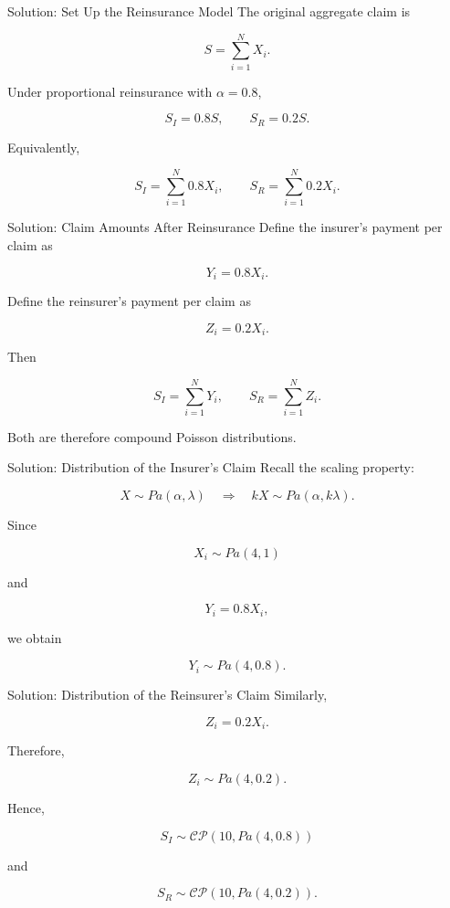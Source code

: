\documentclass[
  ignorenonframetext,
  aspectratio=169,
]{beamer}
\begin{document}
\begin{frame}{Solution: Set Up the Reinsurance Model}
\protect{}\label{solution-set-up-the-reinsurance-model}
The original aggregate claim is

\[
S=\sum_{i=1}^{N}X_i.
\]

Under proportional reinsurance with \(\alpha=0.8\),

\[
S_I=0.8S,
\qquad
S_R=0.2S.
\]

Equivalently,

\[
S_I=\sum_{i=1}^{N}0.8X_i,
\qquad
S_R=\sum_{i=1}^{N}0.2X_i.
\]
\end{frame}

\begin{frame}{Solution: Claim Amounts After Reinsurance}
\protect{}\label{solution-claim-amounts-after-reinsurance}
Define the insurer's payment per claim as

\[
Y_i=0.8X_i.
\]

Define the reinsurer's payment per claim as

\[
Z_i=0.2X_i.
\]

Then

\[
S_I=\sum_{i=1}^{N}Y_i,
\qquad
S_R=\sum_{i=1}^{N}Z_i.
\]

Both are therefore compound Poisson distributions.
\end{frame}

\begin{frame}{Solution: Distribution of the Insurer's Claim}
\protect{}\label{solution-distribution-of-the-insurers-claim}
Recall the scaling property:

\[
X\sim Pa(\alpha,\lambda)
\quad\Longrightarrow\quad
kX\sim Pa(\alpha,k\lambda).
\]

Since

\[
X_i\sim Pa(4,1)
\]

and

\[
Y_i=0.8X_i,
\]

we obtain

\[
\boxed{Y_i\sim Pa(4,0.8)}.
\]
\end{frame}

\begin{frame}{Solution: Distribution of the Reinsurer's Claim}
\protect{}\label{solution-distribution-of-the-reinsurers-claim}
Similarly,

\[
Z_i=0.2X_i.
\]

Therefore,

\[
\boxed{Z_i\sim Pa(4,0.2)}.
\]

Hence,

\[
\boxed{
S_I\sim\mathcal{CP}(10,Pa(4,0.8))
}
\]

and

\[
\boxed{
S_R\sim\mathcal{CP}(10,Pa(4,0.2))
}.
\]
\end{frame}
\end{document}

